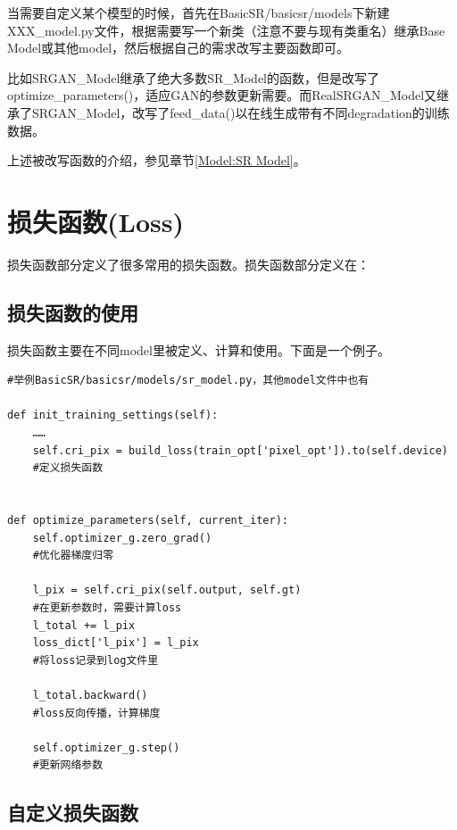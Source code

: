 \documentclass[../main.tex]{subfiles}
\begin{document}
当需要自定义某个模型的时候，首先在BasicSR/basicsr/models下新建XXX\_model.py文件，根据需要写一个新类（注意不要与现有类重名）继承Base Model或其他model，然后根据自己的需求改写主要函数即可。

比如SRGAN\_Model继承了绝大多数SR\_Model的函数，但是改写了optimize\_parameters()，适应GAN的参数更新需要。而RealSRGAN\_Model又继承了SRGAN\_Model，改写了feed\_data()以在线生成带有不同degradation的训练数据。

\begin{note} %
	上述被改写函数的介绍，参见章节\ref{Model:SR Model}。
\end{note}

\section{损失函数(Loss)}

损失函数部分定义了很多常用的损失函数。损失函数部分定义在：
\subsection{损失函数的使用}

损失函数主要在不同model里被定义、计算和使用。下面是一个例子。

\begin{verbatim}
#举例BasicSR/basicsr/models/sr_model.py，其他model文件中也有

def init_training_settings(self):
    ……
    self.cri_pix = build_loss(train_opt['pixel_opt']).to(self.device)
    #定义损失函数


def optimize_parameters(self, current_iter):
    self.optimizer_g.zero_grad()
    #优化器梯度归零

    l_pix = self.cri_pix(self.output, self.gt)
    #在更新参数时，需要计算loss
    l_total += l_pix
    loss_dict['l_pix'] = l_pix
    #将loss记录到log文件里
    
    l_total.backward()
    #loss反向传播，计算梯度
    
    self.optimizer_g.step()
    #更新网络参数
\end{verbatim}

\subsection{自定义损失函数}
\end{document}
